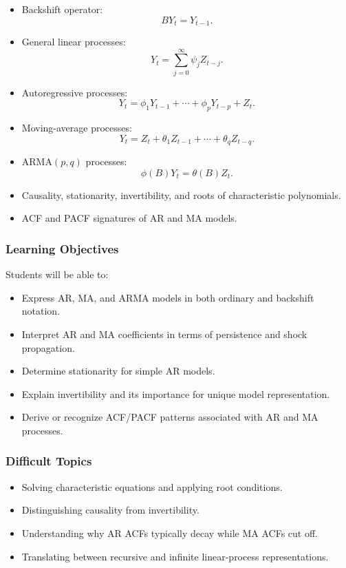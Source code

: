 \documentclass[11pt]{article}
\begin{document}
\begin{itemize}
    \item Backshift operator:
    \[
    B Y_t = Y_{t-1}.
    \]
    \item General linear processes:
    \[
    Y_t = \sum_{j=0}^{\infty}\psi_j Z_{t-j}.
    \]
    \item Autoregressive processes:
    \[
    Y_t = \phi_1Y_{t-1}+\cdots+\phi_pY_{t-p}+Z_t.
    \]
    \item Moving-average processes:
    \[
    Y_t = Z_t+\theta_1Z_{t-1}+\cdots+\theta_qZ_{t-q}.
    \]
    \item ARMA\((p,q)\) processes:
    \[
    \phi(B)Y_t = \theta(B)Z_t.
    \]
    \item Causality, stationarity, invertibility, and roots of characteristic
    polynomials.
    \item ACF and PACF signatures of AR and MA models.
\end{itemize}

\subsubsection{Learning Objectives}

Students will be able to:

\begin{itemize}
    \item Express AR, MA, and ARMA models in both ordinary and backshift
    notation.
    \item Interpret AR and MA coefficients in terms of persistence and shock
    propagation.
    \item Determine stationarity for simple AR models.
    \item Explain invertibility and its importance for unique model
    representation.
    \item Derive or recognize ACF/PACF patterns associated with AR and MA
    processes.
\end{itemize}

\subsubsection{Difficult Topics}

\begin{itemize}
    \item Solving characteristic equations and applying root conditions.
    \item Distinguishing causality from invertibility.
    \item Understanding why AR ACFs typically decay while MA ACFs cut off.
    \item Translating between recursive and infinite linear-process
    representations.
\end{itemize}
\end{document}
